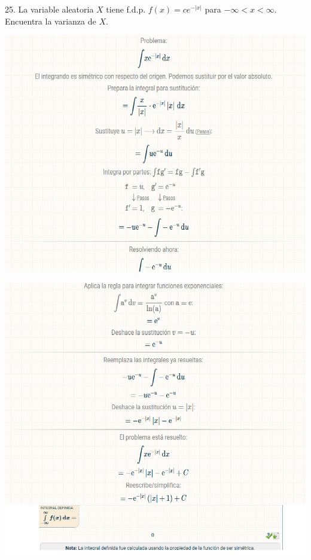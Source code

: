 \documentclass{article}
\begin{document}
        \newpage

        25. La variable aleatoria $X$ tiene f.d.p. $f(x)=ce^{-|x|}$ para $-\infty<x<\infty$. 
        Encuentra la varianza de $X$.

        \begin{center}
            \includegraphics[scale=0.4]{proba2.png}   
        \end{center}

        \begin{center}
            \includegraphics[scale=0.4]{proba3.png}
        \end{center}
    
\end{document}
